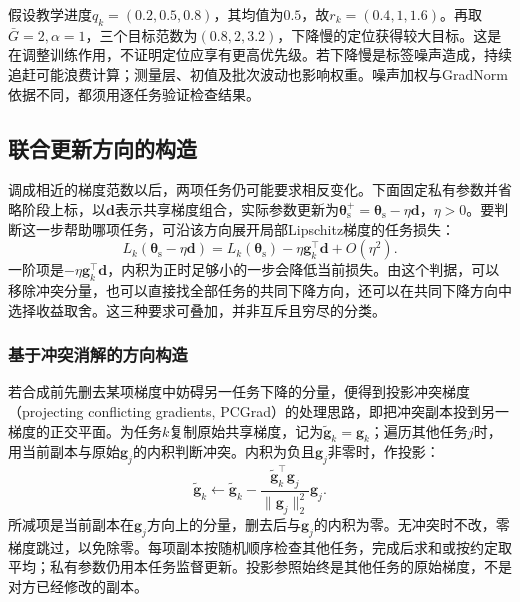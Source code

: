 假设教学进度$q_k=(0.2,0.5,0.8)$，其均值为$0.5$，故$r_k=(0.4,1,1.6)$。再取$\bar G=2,\alpha=1$，三个目标范数为$(0.8,2,3.2)$，下降慢的定位获得较大目标。这是在调整训练作用，不证明定位应享有更高优先级。若下降慢是标签噪声造成，持续追赶可能浪费计算；测量层、初值及批次波动也影响权重。噪声加权与GradNorm依据不同，都须用逐任务验证检查结果。

\subsection{联合更新方向的构造}
\label{sec:ket-sharing-directions}

调成相近的梯度范数以后，两项任务仍可能要求相反变化。下面固定私有参数并省略阶段上标，以$\bm d$表示共享梯度组合，实际参数更新为$\bm{\theta}_{\mathrm s}^{+}=\bm{\theta}_{\mathrm s}-\eta\bm d$，$\eta>0$。要判断这一步帮助哪项任务，可沿该方向展开局部Lipschitz梯度的任务损失：
\begin{equation}
  L_k(\bm{\theta}_{\mathrm s}-\eta\bm d)
  =L_k(\bm{\theta}_{\mathrm s})
   -\eta\bm g_k^{\top}\bm d+O(\eta^2).
  \label{eq:ket-sharing-direction-effect}
\end{equation}
一阶项是$-\eta\bm g_k^{\top}\bm d$，内积为正时足够小的一步会降低当前损失。由这个判据，可以移除冲突分量，也可以直接找全部任务的共同下降方向，还可以在共同下降方向中选择收益取舍。这三种要求可叠加，并非互斥且穷尽的分类。

\subsubsection{基于冲突消解的方向构造}
\label{sec:ket-sharing-pcgrad}

若合成前先删去某项梯度中妨碍另一任务下降的分量，便得到投影冲突梯度（projecting conflicting gradients, PCGrad）的处理思路，即把冲突副本投到另一梯度的正交平面。为任务$k$复制原始共享梯度，记为$\widetilde{\bm g}_k=\bm g_k$；遍历其他任务$j$时，用当前副本与原始$\bm g_j$的内积判断冲突。内积为负且$\bm g_j$非零时，作投影：
\begin{equation}
  \widetilde{\bm g}_k\leftarrow
  \widetilde{\bm g}_k-
  \frac{\widetilde{\bm g}_k^{\top}\bm g_j}
       {\|\bm g_j\|_2^2}\bm g_j.
  \label{eq:ket-sharing-pcgrad-projection}
\end{equation}
所减项是当前副本在$\bm g_j$方向上的分量，删去后与$\bm g_j$的内积为零。无冲突时不改，零梯度跳过，以免除零。每项副本按随机顺序检查其他任务，完成后求和或按约定取平均；私有参数仍用本任务监督更新。投影参照始终是其他任务的原始梯度，不是对方已经修改的副本。

